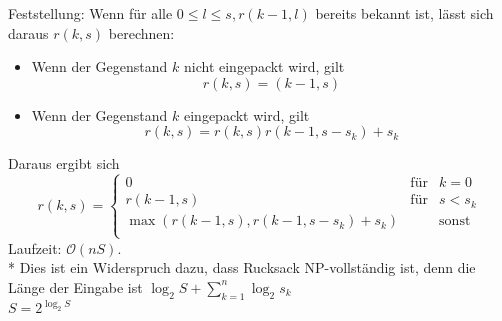 \documentclass[a4paper]{scrartcl}
\begin{document}
Feststellung: Wenn für alle $0 \leq l \leq s, r(k-1,l)$ bereits bekannt ist, lässt sich daraus $r(k,s)$ berechnen:
\begin{itemize}
\item Wenn der Gegenstand $k$ nicht eingepackt wird, gilt
\[ r(k,s) = (k-1,s) \]
\item Wenn der Gegenstand $k$ eingepackt wird, gilt
\[ r(k,s) = r(k,s) r(k-1,s-s_k) + s_k \]
\end{itemize}
Daraus ergibt sich
\[ r(k,s) = \left \{ \begin{array}{lcr} 0 & \text{für} & k= 0 \\ r(k-1,s) & \text{für} & s < s_k\\ \max{(r(k-1,s),r(k-1,s-s_k)+s_k)} & & \text{sonst}\\ \end{array} \right. \]
Laufzeit: $\mathcal{O}(nS)$.\\*
Dies ist ein Widerspruch dazu, dass Rucksack \textsc{NP}-vollständig ist, denn die Länge der Eingabe ist $\log_2{S} + \sum\limits_{k=1}^{n} \log_2{s_k}$\\
$S= 2^{\log_2{S}}$
\end{document}
